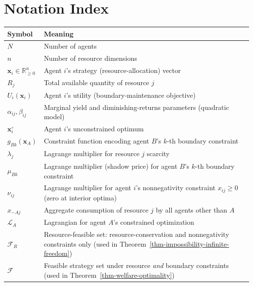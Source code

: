 \documentclass[11pt]{article}
\theoremstyle{plain}
\theoremstyle{definition}
\theoremstyle{remark}
\newcounter{none}
\let\origsection\section
\renewcommand{\section}{\needspace{12\baselineskip}\origsection}
\begin{document}
\section{Notation Index}\label{notation-index}

{\def\LTcaptype{none} %
\begin{longtable}[]{@{}
  >{\raggedright\arraybackslash}p{}
  >{\raggedright\arraybackslash}p{}@{}}
\toprule\noalign{}
\begin{minipage}[b]{\linewidth}\raggedright
Symbol
\end{minipage} & \begin{minipage}[b]{\linewidth}\raggedright
Meaning
\end{minipage} \\
\midrule\noalign{}
\endhead
\bottomrule\noalign{}
\endlastfoot
\(N\) & Number of agents \\
\(n\) & Number of resource dimensions \\
\(\mathbf{x}_i \in \mathbb{R}_{\geq 0}^n\) & Agent \(i\)'s strategy
(resource-allocation) vector \\
\(R_j\) & Total available quantity of resource \(j\) \\
\(U_i(\mathbf{x}_i)\) & Agent \(i\)'s utility (boundary-maintenance
objective) \\
\(\alpha_{ij}, \beta_{ij}\) & Marginal yield and diminishing-returns
parameters (quadratic model) \\
\(\mathbf{x}_i^{\circ}\) & Agent \(i\)'s unconstrained optimum \\
\(g_{Bk}(\mathbf{x}_A)\) & Constraint function encoding agent \(B\)'s
\(k\)-th boundary constraint \\
\(\lambda_j\) & Lagrange multiplier for resource \(j\) scarcity \\
\(\mu_{Bk}\) & Lagrange multiplier (shadow price) for agent \(B\)'s
\(k\)-th boundary constraint \\
\(\nu_{ij}\) & Lagrange multiplier for agent \(i\)'s nonnegativity
constraint \(x_{ij} \geq 0\) (zero at interior optima) \\
\(\hat{x}_{-Aj}\) & Aggregate consumption of resource \(j\) by all
agents other than \(A\) \\
\(\mathcal{L}_A\) & Lagrangian for agent \(A\)'s constrained
optimization \\
\(\mathcal{F}_R\) & Resource-feasible set: resource-conservation and
nonnegativity constraints only (used in
Theorem~\ref{thm-impossibility-infinite-freedom}) \\
\(\mathcal{F}\) & Feasible strategy set under resource \emph{and}
boundary constraints (used in Theorem~\ref{thm-welfare-optimality}) \\
\end{longtable}
}
\end{document}
